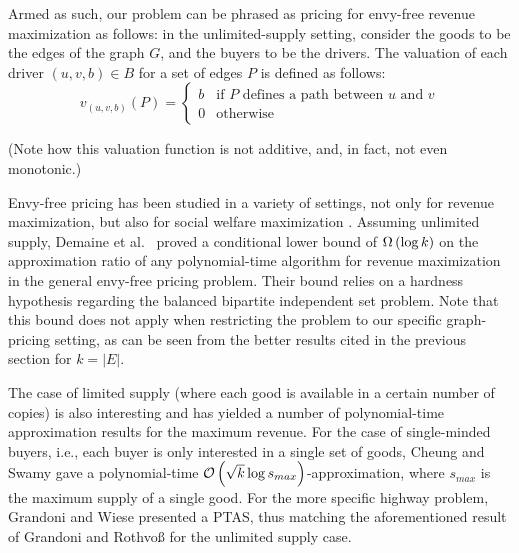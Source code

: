 Armed as such, our problem can be phrased as pricing for envy-free revenue maximization as follows: in the unlimited-supply setting, consider the goods to be the edges of the graph $G$, and the buyers to be the drivers. The valuation of each driver $(u, v, b) \in B$ for a set of edges $P$ is defined as follows:
% 
$$ v_{(u, v, b)}(P) = \begin{cases}
      b & \text{if } P \text{ defines a path between } u \text{ and } v \\
      0 & \text{otherwise}
   \end{cases} $$
   
\noindent (Note how this valuation function is not additive, and, in fact, not even monotonic.)

Envy-free pricing has been studied in a variety of settings, not only for revenue maximization, but also for social welfare maximization \cite{largeMarkets, priceDoubling, impreciseDistribution}. 
Assuming unlimited supply, Demaine et al.~\cite{demaine2008combination} proved a conditional lower bound of $\Omega \left( \log k \right)$ on the approximation ratio of any polynomial-time algorithm for revenue maximization in the general envy-free pricing problem. Their bound relies on a hardness hypothesis regarding the balanced bipartite independent set problem.
Note that this bound does not apply when restricting the problem to our specific graph-pricing setting, as can be seen from the better results cited in the previous section for $k = |E|$.

The case of limited supply (where each good is available in a certain number of copies) is also interesting and has yielded a number of polynomial-time approximation results for the maximum revenue. For the case of single-minded buyers, i.e., each buyer is only interested in a single set of goods, Cheung and Swamy \cite{Cheung08} gave a polynomial-time $\mathcal{O} \left( \sqrt{k} \log s_{max} \right)$-ap\-prox\-i\-ma\-tion, where $s_{max}$ is the maximum supply of a single good. For the more specific highway problem, Grandoni and Wiese \cite{grandoni_et_al:LIPIcs:2019:11175} presented a PTAS, thus matching the aforementioned result of Grandoni and Rothvo{\ss} \cite{grandoni2016pricing} for the unlimited supply case.


